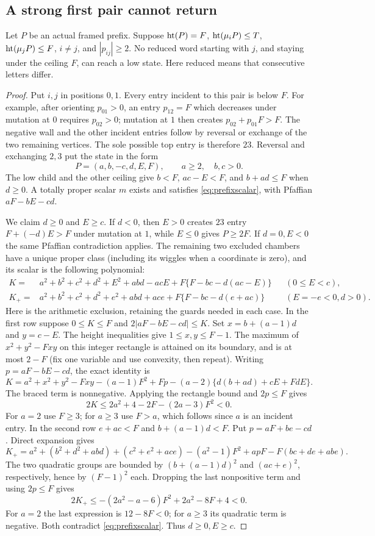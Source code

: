 \subsection{A strong first pair cannot return}
\begin{lemma}\label{lem:strong}
Let $P$ be an actual framed prefix. Suppose $\operatorname{ht}(P)=F$, $\operatorname{ht}(\mu_iP)\le T$, $\operatorname{ht}(\mu_jP)\le F$, $i\ne j$, and $|p_{ij}|\ge2$. No reduced word starting with $j$, and staying under the ceiling $F$, can reach a low state. Here reduced means that consecutive letters differ.
\end{lemma}
\begin{proof}
Put $i,j$ in positions $0,1$. Every entry incident to this pair is below $F$. For example, after orienting $p_{01}>0$, an entry $p_{12}=F$ which decreases under mutation at $0$ requires $p_{02}>0$; mutation at $1$ then creates $p_{02}+p_{01}F>F$. The negative wall and the other incident entries follow by reversal or exchange of the two remaining vertices. The sole possible top entry is therefore $23$. Reversal and exchanging $2,3$ put the state in the form
\[
 P=(a,b,-c,d,E,F),\qquad a\ge2,\quad b,c>0.
\]
The low child and the other ceiling give $b<F$, $ac-E<F$, and $b+ad\le F$ when $d\ge0$. A totally proper scalar $m$ exists and satisfies \eqref{eq:prefixscalar}, with Pfaffian $aF-bE-cd$.

We claim $d\ge0$ and $E\ge c$. If $d<0$, then $E>0$ creates $23$ entry $F+(-d)E>F$ under mutation at $1$, while $E\le0$ gives $P\ge2F$. If $d=0,E<0$ the same Pfaffian contradiction applies. The remaining two excluded chambers have a unique proper class (including its wiggles when a coordinate is zero), and its scalar is the following polynomial:
\begin{align*}
 K={}&a^2+b^2+c^2+d^2+E^2+abd-acE
       +F\{F-bc-d(ac-E)\} &&(0\le E<c),\\
 K_+={}&a^2+b^2+c^2+d^2+e^2+abd+ace
       +F\{F-bc-d(e+ac)\} &&(E=-e<0,d>0).
\end{align*}
Here is the arithmetic exclusion, retaining the guards needed in each case. In the first row suppose $0\le K\le F$ and $2|aF-bE-cd|\le K$. Set $x=b+(a-1)d$ and $y=c-E$. The height inequalities give $1\le x,y\le F-1$. The maximum of $x^2+y^2-Fxy$ on this integer rectangle is attained on its boundary, and is at most $2-F$ (fix one variable and use convexity, then repeat). Writing $p=aF-bE-cd$, the exact identity is
\[
 K=a^2+x^2+y^2-Fxy-(a-1)F^2+Fp
 -(a-2)\{d(b+ad)+cE+FdE\}.
\]
The braced term is nonnegative. Applying the rectangle bound and $2p\le F$ gives
\[
 2K\le2a^2+4-2F-(2a-3)F^2<0.
\]
For $a=2$ use $F\ge3$; for $a\ge3$ use $F>a$, which follows since $a$ is an incident entry. In the second row $e+ac<F$ and $b+(a-1)d<F$. Put $p=aF+be-cd$. Direct expansion gives
\[
 K_+=a^2+(b^2+d^2+abd)+(c^2+e^2+ace)
 -(a^2-1)F^2+apF-F(bc+de+abe).
\]
The two quadratic groups are bounded by $(b+(a-1)d)^2$ and $(ac+e)^2$, respectively, hence by $(F-1)^2$ each. Dropping the last nonpositive term and using $2p\le F$ gives
\[
 2K_+\le-(2a^2-a-6)F^2+2a^2-8F+4<0.
\]
For $a=2$ the last expression is $12-8F<0$; for $a\ge3$ its quadratic term is negative. Both contradict \eqref{eq:prefixscalar}. Thus $d\ge0,E\ge c$.


\end{proof}
